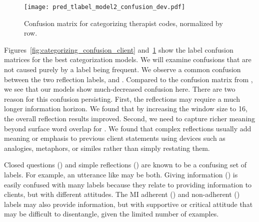 \begin{figure}[!th]
\centering

  \texttt{[image: pred\_tlabel\_model2\_confusion\_dev.pdf]}
  \caption{\label{fig:categorizing_confusion_therapist} Confusion matrix for categorizing therapist codes, normalized by row.}
\end{figure}

Figures~\ref{fig:categorizing_confusion_client} and~\ref{fig:categorizing_confusion_therapist} show the
label confusion matrices for the best categorization models. We will
examine confusions that are not caused purely by a label being
frequent. We observe a common confusion between
the two reflection labels, \REC and \RES. Compared to the
confusion matrix from \citet{xiao2016behavioral}, we see that our
models show much-decreased confusion here. There are two reason for
this confusion persisting. First, the reflections may require a much
longer information horizon. We found that by increasing the window
size to 16, the overall reflection results improved. Second, we need
to capture richer meaning beyond surface word overlap for
\RES. We found that
complex reflections usually add meaning or emphasis  to
previous client statements using devices such as analogies,
metaphors, or similes rather than simply restating them. %

%
Closed questions (\QUC) and simple reflections (\RES) are known to
be a confusing set of labels. For example, an utterance like
 may be both.
%
Giving information (\GI)
is easily confused with many labels because they relate to providing
information to clients, but with different attitudes. The MI adherent
(\MIA) and non-adherent (\MIN) labels may also provide information,
but with supportive or critical attitude that may be difficult to
disentangle, given the limited number of examples.


